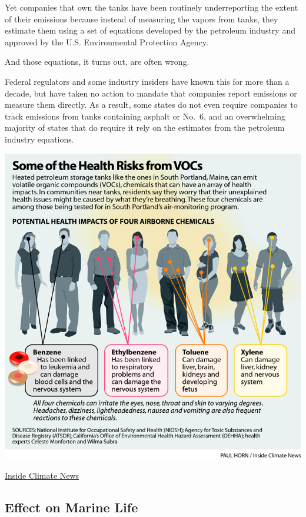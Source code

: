 \documentclass[
]{book}
\begin{document}
Yet companies that own the tanks have been routinely underreporting the extent of their emissions because instead of measuring the vapors from tanks, they estimate them using a set of equations developed by the petroleum industry and approved by the U.S. Environmental Protection Agency.

And those equations, it turns out, are often wrong.

Federal regulators and some industry insiders have known this for more than a decade, but have taken no action to mandate that companies report emissions or measure them directly. As a result, some states do not even require companies to track emissions from tanks containing asphalt or No.~6, and an overwhelming majority of states that do require it rely on the estimates from the petroleum industry equations.

\includegraphics{fig/VOCs_Chemical_Health_Effects.png}

\href{https://insideclimatenews.org/news/18042021/toxic-neighbords-tank-fumes-epa-harmful-chemicals/}{Inside Climate News}

\hypertarget{effect-on-marine-life}{%
\subsection{Effect on Marine Life}\label{effect-on-marine-life}}
\end{document}
